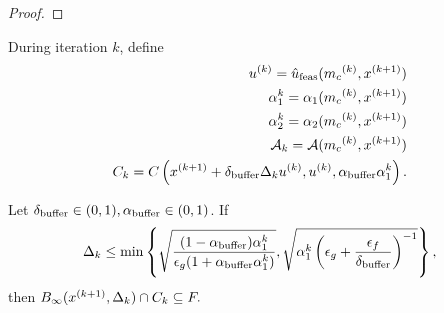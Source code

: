 \begin{proof}
\end{proof}


During iteration $k$, define
\begin{align*}
u^{(k)} = {\hat{u}_{\text{feas}}}({{m}_{c}}^{(k)}, {x}^{(k+1)}) \\
\alpha_1^k = \alpha_1({{m}_{c}}^{(k)}, {x}^{(k+1)}) \\
\alpha_2^k = \alpha_2({{m}_{c}}^{(k)}, {x}^{(k+1)}) \\
\mathcal A_k = \mathcal A({{m}_{c}}^{(k)}, {x}^{(k+1)}) \\
C_k = C\left({x}^{(k+1)} + {\delta_{\text{buffer}}}\Delta_k u^{(k)}, u^{(k)}, {\alpha_{\text{buffer}}}\alpha_1^k\right). \\
\end{align*}

\begin{theorem}
Let ${\delta_{\text{buffer}}} \in (0, 1), {\alpha_{\text{buffer}}} \in (0, 1)$.
If
\begin{align*}
\Delta_k \le \min\left\{
\sqrt{\frac{(1 - {\alpha_{\text{buffer}}}) \alpha_1^k}{\epsilon_g(1 + {\alpha_{\text{buffer}}}\alpha_1^k)}},
\sqrt{\alpha_1^k \left(\epsilon_g + \frac{\epsilon_f}{{\delta_{\text{buffer}}}}\right)^{-1}}
\right\},
\end{align*}
then $B_{\infty}({x}^{(k+1)}, \Delta_k)\cap C_k \subseteq {F}.$
\end{theorem}

